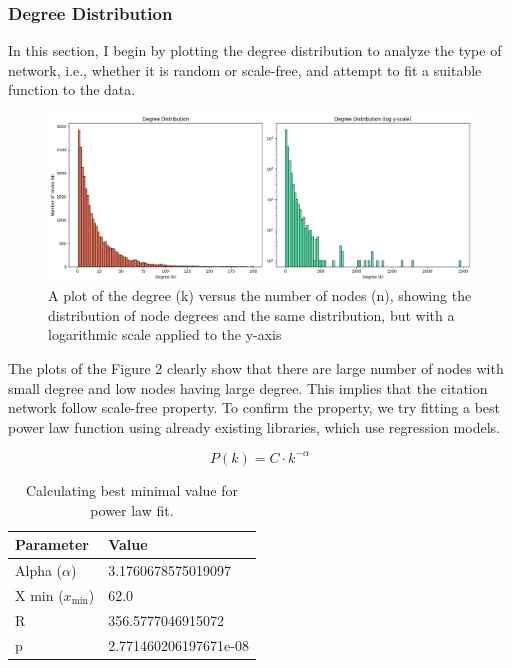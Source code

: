 \documentclass{article}
\begin{document}
\subsubsection{Degree Distribution}
In this section, I begin by plotting the degree distribution to analyze the type of network, i.e., whether it is random or scale-free, and attempt to fit a suitable function to the data. 

\begin{figure}[h]
\begin{center}
\includegraphics[width=1\textwidth]{Figures/Degree Distribution.png}
\end{center}
\caption{A plot of the degree (k) versus the number of nodes (n), showing the distribution of node degrees and the same distribution, but with a logarithmic scale applied to the y-axis}
\end{figure}

The plots of the Figure 2 clearly show that there are large number of nodes with small degree and low nodes having large degree. This implies that the citation network follow scale-free property. To confirm the property, we try fitting a best power law function using already existing libraries, which use regression models.

\begin{equation}
    P(k) = C \cdot k^{-\alpha}
    \label{eq:power_law}
\end{equation}

\begin{table}[h]
    \centering
    \begin{tabular}{ll}
        \hline
        Parameter & Value \\
        \hline
        Alpha ($\alpha$) & 3.1760678575019097 \\
        X min ($x_{\text{min}}$) & 62.0 \\
        R & 356.5777046915072 \\
        p & 2.771460206197671e-08 \\
        \hline
    \end{tabular}
    \caption{Calculating best minimal value for power law fit.}
    \label{tab:power_law_fit}
\end{table}
\end{document}
